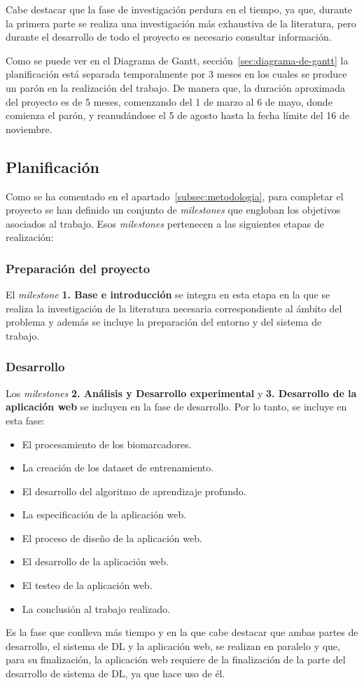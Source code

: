 Cabe destacar que la fase de investigación perdura en el tiempo, ya que, durante la primera parte se realiza una
investigación más exhaustiva de la literatura, pero durante el desarrollo de todo el proyecto es necesario consultar
información.

Como se puede ver en el Diagrama de Gantt, sección~\ref{sec:diagrama-de-gantt} la planificación está separada temporalmente por
3 meses en los cuales se produce un parón en la realización del trabajo.
De manera que, la duración aproximada del proyecto es de 5 meses, comenzando del 1 de marzo al 6 de mayo, donde comienza
el parón, y reanudándose el 5 de agosto hasta la fecha límite del 16 de noviembre.

\subsection{Planificación}\label{subsec:planificacion}
Como se ha comentado en el apartado~\ref{subsec:metodologia}, para completar el proyecto se han definido un conjunto
de \textit{milestones} que engloban los objetivos asociados al trabajo.
Esos \textit{milestones} pertenecen a las siguientes etapas de realización:

\subsubsection{Preparación del proyecto}
El \textit{milestone} \textbf{1. Base e introducción} se integra en esta etapa en la que se realiza la investigación de
la literatura necesaria correspondiente al ámbito del problema y además se incluye la preparación del entorno y del
sistema de trabajo.

\subsubsection{Desarrollo}
Los \textit{milestones} \textbf{2. Análisis y Desarrollo experimental} y \textbf{3. Desarrollo de la aplicación web} se
incluyen en la fase de desarrollo.
Por lo tanto, se incluye en esta fase:

\begin{itemize}
    \item El procesamiento de los biomarcadores.
    \item La creación de los dataset de entrenamiento.
    \item El desarrollo del algoritmo de aprendizaje profundo.
    \item La especificación de la aplicación web.
    \item El proceso de diseño de la aplicación web.
    \item El desarrollo de la aplicación web.
    \item El testeo de la aplicación web.
    \item La conclusión al trabajo realizado. \\
\end{itemize}
Es la fase que conlleva más tiempo y en la que cabe destacar que ambas partes de desarrollo, el sistema de DL y la
aplicación web, se realizan en paralelo y que, para su finalización, la aplicación web requiere de la finalización de
la parte del desarrollo de sistema de DL, ya que hace uso de él.

